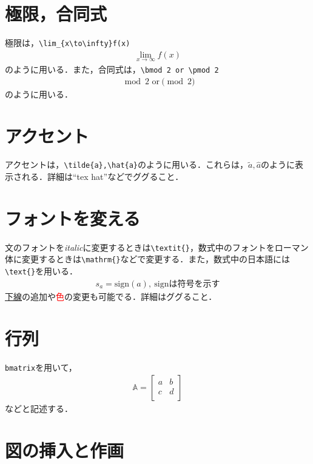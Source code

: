 \documentclass[11pt,a4paper]{jsarticle}
\begin{document}
\section{極限，合同式}

極限は，\verb|\lim_{x\to\infty}f(x)|
\begin{align*}
  \lim_{x\to\infty}f(x)
\end{align*}
のように用いる．また，合同式は，\verb|\bmod 2 or \pmod 2|
\begin{align*}
  \bmod 2 \text{~or} \pmod 2
\end{align*}
のように用いる．

\section{アクセント}

アクセントは，\verb|\tilde{a},\hat{a}|のように用いる．これらは，$\tilde{a},\hat{a}$のように表示される．詳細は``tex hat''などでググること．

\section{フォントを変える}

文のフォントを\textit{italic}に変更するときは\verb|\textit{}|，数式中のフォントをローマン体に変更するときは\verb|\mathrm{}|などで変更する．また，数式中の日本語には\verb|\text{}|を用いる．
\begin{align*}
  s_a = \mathrm{sign}(a),~\text{signは符号を示す}
\end{align*}
\underline{下線}の追加や\textcolor{red}{色}の変更も可能でる．詳細はググること．

\section{行列}

\verb|bmatrix|を用いて，
\begin{align*}
  \mathbb{A}=
  \begin{bmatrix}
    a & b \\
    c & d \\
  \end{bmatrix}
\end{align*}
などと記述する．

\section{図の挿入と作画}
\end{document}
